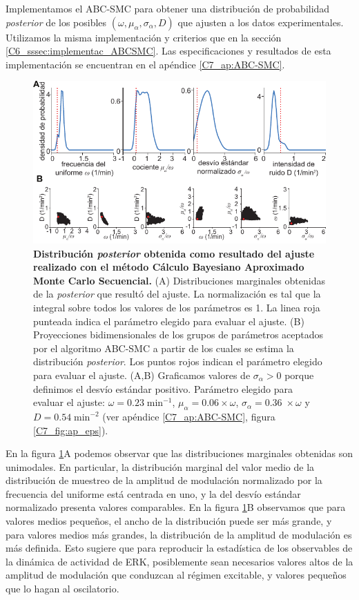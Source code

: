 \documentclass[./main.tex]{subfiles}
\begin{document}
Implementamos el ABC-SMC para obtener una distribución de probabilidad \textit{posterior} de los posibles $(\omega,\mu_{\alpha},\sigma_{\alpha},D)$ que ajusten a los datos experimentales. Utilizamos la misma implementación y criterios que en la sección \ref{C6_sssec:implementac_ABCSMC}. Las especificaciones y resultados de esta implementación se encuentran en el apéndice \ref{C7_ap:ABC-SMC}.


\begin{figure}
    \centering
    \includegraphics[width=1\columnwidth]{figures/chapter7/C7_dist_fit.pdf} 
    \caption{\textbf{Distribución \textit{posterior} obtenida como resultado del ajuste realizado con el método Cálculo Bayesiano Aproximado Monte Carlo Secuencial.} (A) Distribuciones marginales obtenidas de la \textit{posterior} que resultó del ajuste. La normalización es tal que la integral sobre todos los valores de los parámetros es 1. La linea roja punteada indica el parámetro elegido para evaluar el ajuste. (B) Proyecciones bidimensionales de los grupos de parámetros aceptados por el algoritmo ABC-SMC a partir de los cuales se estima la distribución \textit{posterior}. Los puntos rojos indican el parámetro elegido para evaluar el ajuste. (A,B) Graficamos valores de $\sigma_{\alpha}  > 0$ porque definimos el desvío estándar positivo. Parámetro elegido para evaluar el ajuste: $\omega = 0.23 \; \text{min}^{-1}$, $\mu_{\alpha} = 0.06 \times \omega$, $ \sigma_{\alpha} = 0.36 \;  \times \omega $ y $D = 0.54 \;\text{min}^{-2}$ (ver apéndice \ref{C7_ap:ABC-SMC}, figura \ref{C7_fig:ap_eps}).}
    \label{C7_fig:dist_fit}
\end{figure} 


En la figura \ref{C7_fig:dist_fit}A podemos observar que las distribuciones marginales obtenidas son unimodales. En particular, la distribución marginal del valor medio de la distribución de muestreo de la amplitud de modulación normalizado por la frecuencia del uniforme está centrada en uno, y la del desvío estándar normalizado presenta valores comparables. En la figura \ref{C7_fig:dist_fit}B observamos que para valores medios pequeños, el ancho de la distribución puede ser más grande, y para valores medios más grandes, la distribución de la amplitud de modulación es más definida. Esto sugiere que para reproducir la estadística de los observables de la dinámica de actividad de ERK, posiblemente sean necesarios valores altos de la amplitud de modulación que conduzcan al régimen excitable, y valores pequeños que lo hagan al oscilatorio.  
\end{document}
